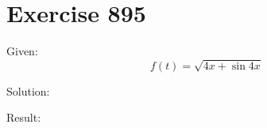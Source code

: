 \documentclass[a4paper, 10pt]{scrartcl}
\begin{document}
\section{Exercise 895}

Given:
\[
f(t) = \sqrt{4x + \sin{4x}}
\]

Solution:

Result:
\end{document}
